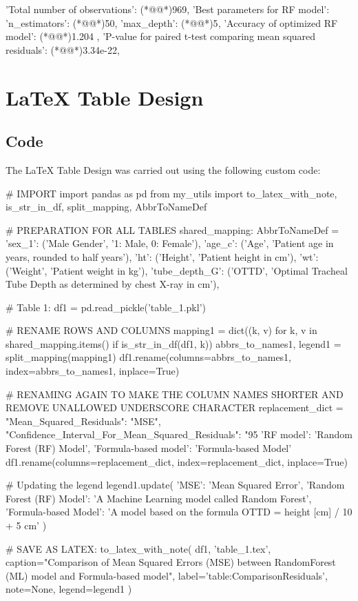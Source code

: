 \documentclass[11pt]{article}
\begin{document}
\begin{codeoutput}
{
    'Total number of observations': (*@@*)969,
    'Best parameters for RF model': {'n_estimators': (*@@*)50, 'max_depth': (*@@*)5},
    'Accuracy of optimized RF model': (*@@*)1.204             ,
    'P-value for paired t-test comparing mean squared residuals': (*@@*)3.34e-22,
}
\end{codeoutput}

\section{LaTeX Table Design}
\subsection{{Code}}
The LaTeX Table Design was carried out using the following custom code:

\begin{python}

# IMPORT
import pandas as pd
from my_utils import to_latex_with_note, is_str_in_df, split_mapping, AbbrToNameDef

# PREPARATION FOR ALL TABLES
shared_mapping: AbbrToNameDef = {
    'sex_1': ('Male Gender', '1: Male, 0: Female'),
    'age_c': ('Age', 'Patient age in years, rounded to half years'),
    'ht': ('Height', 'Patient height in cm'),
    'wt': ('Weight', 'Patient weight in kg'),
    'tube_depth_G': ('OTTD', 'Optimal Tracheal Tube Depth as determined by chest X-ray in cm'),
}

# Table 1:
df1 = pd.read_pickle('table_1.pkl')

# RENAME ROWS AND COLUMNS
mapping1 = dict((k, v) for k, v in shared_mapping.items() if is_str_in_df(df1, k)) 
abbrs_to_names1, legend1 = split_mapping(mapping1)
df1.rename(columns=abbrs_to_names1, index=abbrs_to_names1, inplace=True)

# RENAMING AGAIN TO MAKE THE COLUMN NAMES SHORTER AND REMOVE UNALLOWED UNDERSCORE CHARACTER
replacement_dict = {
    "Mean_Squared_Residuals": "MSE",
    "Confidence_Interval_For_Mean_Squared_Residuals": "95%
    'RF model': 'Random Forest (RF) Model',
    'Formula-based model': 'Formula-based Model'
}
df1.rename(columns=replacement_dict, index=replacement_dict, inplace=True)

# Updating the legend
legend1.update({
    'MSE': 'Mean Squared Error',
    'Random Forest (RF) Model': 'A Machine Learning model called Random Forest',
    'Formula-based Model': 'A model based on the formula OTTD = height [cm] / 10 + 5 cm'
})

# SAVE AS LATEX:
to_latex_with_note(
    df1, 'table_1.tex',
    caption="Comparison of Mean Squared Errors (MSE) between RandomForest (ML) model and Formula-based model", 
    label='table:ComparisonResiduals',
    note=None,
    legend=legend1
)

\end{python}
\end{document}
